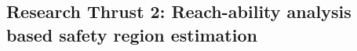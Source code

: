 \subsection{Research Thrust 2: Reach-ability analysis based safety region estimation}
\label{sec:reachability}
